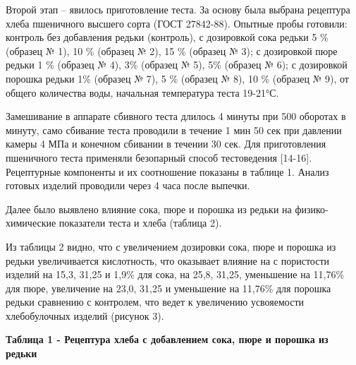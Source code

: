 \begin{multicols}{2}
Второй этап -- явилось приготовление теста. За основу была выбрана
рецептура хлеба пшеничного высшего сорта (ГОСТ 27842-88). Опытные пробы
готовили: контроль без добавления редьки (контроль), с дозировкой сока
редьки 5 \% (образец № 1), 10 \% (образец № 2), 15 \% (образец № 3); с
дозировкой пюре редьки 1 \% (образец № 4), 3\% (образец № 5), 5\%
(образец № 6); с дозировкой порошка редьки 1\% (образец № 7), 5 \%
(образец № 8), 10 \% (образец № 9), от общего количества воды, начальная
температура теста 19-21°С.

Замешивание в аппарате сбивного теста длилось 4 минуты при 500 оборотах
в минуту, само сбивание теста проводили в течение 1 мин 50 сек при
давлении камеры 4 МПа и конечном сбивании в течении 30 сек. Для
приготовления пшеничного теста применяли безопарный способ тестоведения
{[}14-16{]}. Рецептурные компоненты и их соотношение показаны в таблице
1. Анализ готовых изделий проводили через 4 часа после выпечки.

Далее было выявлено влияние сока, пюре и порошка из редьки на
физико-химические показатели теста и хлеба (таблица 2).

Из таблицы 2 видно, что с увеличением дозировки сока, пюре и порошка из
редьки увеличивается кислотность, что оказывает влияние на с пористости
изделий на 15,3, 31,25 и 1,9\% для сока, на 25,8, 31,25, уменьшение на
11,76\% для пюре, увеличение на 23,0, 31,25 и уменьшение на 11,76\% для
порошка редьки сравнению с контролем, что ведет к увеличению усвояемости
хлебобулочных изделий (рисунок 3).
\end{multicols}

{\bfseries Таблица 1 - Рецептура хлеба с добавлением сока, пюре и порошка из редьки}

